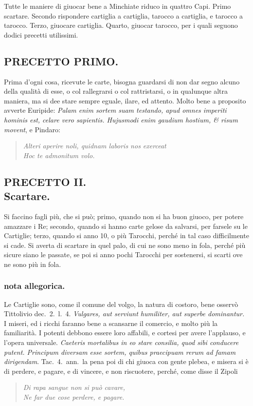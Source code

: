 \documentclass[11pt,a6paper]{article}
\newcommand{\literaryquote}[1]{%
\kern -6pt  \begin{verse}
    {\footnotesize \it #1}
  \end{verse}\kern -2pt%
}
\begin{document}
Tutte le maniere di giuocar bene a Minchiate
riduco in quattro Capi. Primo scartare.
Secondo rispondere cartiglia a cartiglia, tarocco
a cartiglia, e tarocco a tarocco. Terzo, giuocare
cartiglia. Quarto, giuocar tarocco, per i
quali seguono dodici precetti utilissimi.

\subsection{PRECETTO PRIMO.}

Prima d'ogni cosa, ricevute le carte, bisogna
guardarsi di non dar segno alcuno
della qualità di esse, o col rallegrarsi o col
rattristarsi, o in qualunque altra maniera,
ma si dee stare sempre eguale, ilare, ed attento.
Molto bene a proposito avverte Euripide:
\textit{Palam enim sortem suam testando,
  apud omnes imperiti hominis est, celare vero
  sapientis. Hujusmodi enim gaudium hostium,
  \& risum movent}, e Pindaro:

\literaryquote{Alteri aperire noli, quidnam laboris nos exerceat\\
 Hoc te admonitum volo.}


\subsection{PRECETTO II.\\
 \footnotesize Scartare.}
Si faccino fagli più, che si può; primo,
quando non si ha buon giuoco, per potere
amazzare i Re; secondo, quando si hanno
carte gelose da salvarsi, per farsele su le
Cartiglie; terzo, quando si anno 10, o più
Tarocchi, perché in tal caso difficilmente si
cade. Si averta di scartare in quel palo, di
cui ne sono meno in fola, perché più sicure
siano le passate, se poi si anno pochi Tarocchi
per sostenersi, si scarti ove ne sono più in
fola.

\subsubsection{nota allegorica.}
{\footnotesize

Le Cartiglie sono, come il comune del volgo,
la natura di costoro, bene osservò Tittolivio dec.\ 2.\ l.\ 4.
\textit{Vulgares, aut serviunt humiliter, aut superbe dominantur.}
I miseri, ed i ricchi faranno bene
a scansarne il comercio, e molto più la familiarità.
I potenti debbono essere loro affabili, e cortesi per
avere l'applauso, e l'opera universale. \textit{Caeteris
mortalibus in eo stare consilia, quod sibi conducere
putent. Principum diversam esse sortem, quibus
praecipuam rerum ad famam dirigendam}. Tac.\ 4.\
ann.\ la pena poi di chi giuoca con gente plebea, e
misera si è di perdere, e pagare, e di vincere, e non
riscuotere, perché, come disse il Zipoli
\literaryquote{Di rapa sangue non si può cavare, \\
Ne far due cose perdere, e pagare.}
}
\end{document}
